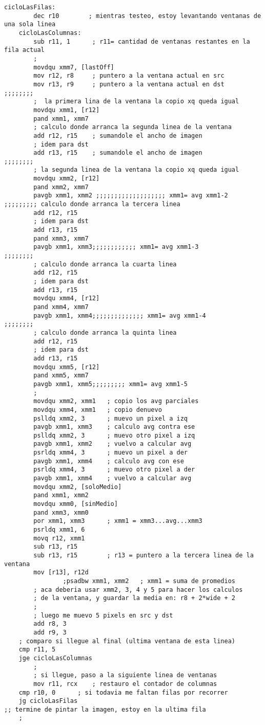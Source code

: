 \begin{verbatim}
cicloLasFilas:
        dec r10        ; mientras testeo, estoy levantando ventanas de una sola linea
    cicloLasColumnas:        
        sub r11, 1      ; r11= cantidad de ventanas restantes en la fila actual
        ;
        movdqu xmm7, [lastOff]
        mov r12, r8     ; puntero a la ventana actual en src
        mov r13, r9     ; puntero a la ventana actual en dst
;;;;;;;;
        ;  la primera lina de la ventana la copio xq queda igual
        movdqu xmm1, [r12]
        pand xmm1, xmm7
        ; calculo donde arranca la segunda linea de la ventana
        add r12, r15    ; sumandole el ancho de imagen
        ; idem para dst
        add r13, r15    ; sumandole el ancho de imagen
;;;;;;;;
        ; la segunda linea de la ventana la copio xq queda igual
        movdqu xmm2, [r12]
        pand xmm2, xmm7
        pavgb xmm1, xmm2 ;;;;;;;;;;;;;;;;;;; xmm1= avg xmm1-2
;;;;;;;;; calculo donde arranca la tercera linea
        add r12, r15
        ; idem para dst
        add r13, r15
        pand xmm3, xmm7
        pavgb xmm1, xmm3;;;;;;;;;;;; xmm1= avg xmm1-3
;;;;;;;;
        ; calculo donde arranca la cuarta linea
        add r12, r15
        ; idem para dst
        add r13, r15
        movdqu xmm4, [r12]
        pand xmm4, xmm7
        pavgb xmm1, xmm4;;;;;;;;;;;;;; xmm1= avg xmm1-4
;;;;;;;;
        ; calculo donde arranca la quinta linea
        add r12, r15
        ; idem para dst
        add r13, r15
        movdqu xmm5, [r12]
        pand xmm5, xmm7
        pavgb xmm1, xmm5;;;;;;;;; xmm1= avg xmm1-5
        ;
        movdqu xmm2, xmm1   ; copio los avg parciales
        movdqu xmm4, xmm1   ; copio denuevo
        pslldq xmm2, 3      ; muevo un pixel a izq
        pavgb xmm1, xmm3    ; calculo avg contra ese
        pslldq xmm2, 3      ; muevo otro pixel a izq
        pavgb xmm1, xmm2    ; vuelvo a calcular avg        
        psrldq xmm4, 3      ; muevo un pixel a der
        pavgb xmm1, xmm4    ; calculo avg con ese
        psrldq xmm4, 3      ; muevo otro pixel a der
        pavgb xmm1, xmm4    ; vuelvo a calcular avg        
        movdqu xmm2, [soloMedio]
        pand xmm1, xmm2
        movdqu xmm0, [sinMedio]
        pand xmm3, xmm0
        por xmm1, xmm3      ; xmm1 = xmm3...avg...xmm3
        psrldq xmm1, 6
        movq r12, xmm1
        sub r13, r15
        sub r13, r15        ; r13 = puntero a la tercera linea de la ventana
        mov [r13], r12d
                ;psadbw xmm1, xmm2   ; xmm1 = suma de promedios
        ; aca deberia usar xmm2, 3, 4 y 5 para hacer los calculos
        ; de la ventana, y guardar la media en: r8 + 2*wide + 2
        ;
        ; luego me muevo 5 pixels en src y dst
        add r8, 3
        add r9, 3
    ; comparo si llegue al final (ultima ventana de esta linea)
    cmp r11, 5
    jge cicloLasColumnas
        ;
        ; si llegue, paso a la siguiente linea de ventanas
        mov r11, rcx    ; restauro el contador de columnas        
    cmp r10, 0      ; si todavia me faltan filas por recorrer
    jg cicloLasFilas
;; termine de pintar la imagen, estoy en la ultima fila
    ;
    

\end{verbatim}
